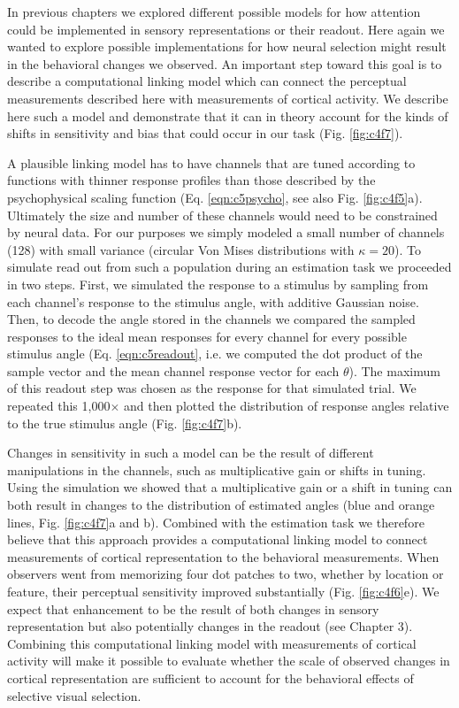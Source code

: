 In previous chapters we explored different possible models for how attention could be implemented in sensory representations or their readout. Here again we wanted to explore possible implementations for how neural selection might result in the behavioral changes we observed. An important step toward this goal is to describe a computational linking model which can connect the perceptual measurements described here with measurements of cortical activity. We describe here such a model and demonstrate that it can in theory account for the kinds of shifts in sensitivity and bias that could occur in our task (Fig. \ref{fig:c4f7}).

A plausible linking model has to have channels that are tuned according to functions with thinner response profiles than those described by the psychophysical scaling function (Eq. \ref{eqn:c5psycho}, see also Fig. \ref{fig:c4f5}a). Ultimately the size and number of these channels would need to be constrained by neural data. For our purposes we simply modeled a small number of channels (128) with small variance (circular Von Mises distributions with $\kappa=20$). To simulate read out from such a population during an estimation task we proceeded in two steps. First, we simulated the response to a stimulus by sampling from each channel's response to the stimulus angle, with additive Gaussian noise. Then, to decode the angle stored in the channels we compared the sampled responses to the ideal mean responses for every channel for every possible stimulus angle (Eq. \ref{eqn:c5readout}, i.e. we computed the dot product of the sample vector and the mean channel response vector for each $\theta$). The maximum of this readout step was chosen as the response for that simulated trial. We repeated this 1,000$\times$ and then plotted the distribution of response angles relative to the true stimulus angle (Fig. \ref{fig:c4f7}b).

Changes in sensitivity in such a model can be the result of different manipulations in the channels, such as multiplicative gain or shifts in tuning. Using the simulation we showed that a multiplicative gain or a shift in tuning can both result in changes to the distribution of estimated angles (blue and orange lines, Fig. \ref{fig:c4f7}a and b). Combined with the estimation task we therefore believe that this approach provides a computational linking model to connect measurements of cortical representation to the behavioral measurements. When observers went from memorizing four dot patches to two, whether by location or feature, their perceptual sensitivity improved substantially (Fig. \ref{fig:c4f6}e). We expect that enhancement to be the result of both changes in sensory representation but also potentially changes in the readout (see Chapter 3). Combining this computational linking model with measurements of cortical activity will make it possible to evaluate whether the scale of observed changes in cortical representation are sufficient to account for the behavioral effects of selective visual selection. 

